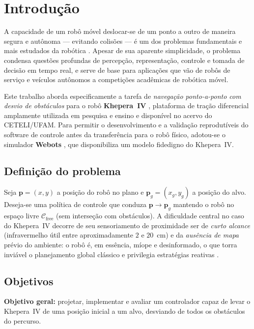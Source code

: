 \documentclass[11pt,a4paper]{article}
\begin{document}
\tableofcontents
\bigskip

\section{Introdução}
A capacidade de um robô móvel deslocar-se de um ponto a outro de maneira segura e autônoma --- evitando colisões --- é um dos problemas fundamentais e mais estudados da robótica \cite{siegwart2011,thrun2005}. Apesar de sua aparente simplicidade, o problema condensa questões profundas de percepção, representação, controle e tomada de decisão em tempo real, e serve de base para aplicações que vão de robôs de serviço e veículos autônomos a competições acadêmicas de robótica móvel.

Este trabalho aborda especificamente a tarefa de \emph{navegação ponto-a-ponto com desvio de obstáculos} para o robô \textbf{Khepera~IV} \cite{soares2016khepera}, plataforma de tração diferencial amplamente utilizada em pesquisa e ensino e disponível no acervo do CETELI/UFAM. Para permitir o desenvolvimento e a validação reprodutíveis do software de controle antes da transferência para o robô físico, adotou-se o simulador \textbf{Webots} \cite{michel2004webots}, que disponibiliza um modelo fidedigno do Khepera~IV.

\subsection{Definição do problema}
Seja $\mathbf{p}=(x,y)$ a posição do robô no plano e $\mathbf{p}_g=(x_g,y_g)$ a posição do alvo. Deseja-se uma política de controle que conduza $\mathbf{p}\to\mathbf{p}_g$ mantendo o robô no espaço livre $\mathcal{C}_{\text{free}}$ (sem interseção com obstáculos). A dificuldade central no caso do Khepera~IV decorre de seu sensoriamento de proximidade ser de \emph{curto alcance} (infravermelho útil entre aproximadamente $2$ e $20$~cm) e da \emph{ausência de mapa} prévio do ambiente: o robô é, em essência, míope e desinformado, o que torra inviável o planejamento global clássico e privilegia estratégias reativas \cite{brooks1986}.

\subsection{Objetivos}
\noindent\textbf{Objetivo geral:} projetar, implementar e avaliar um controlador capaz de levar o Khepera~IV de uma posição inicial a um alvo, desviando de todos os obstáculos do percurso.
\end{document}
